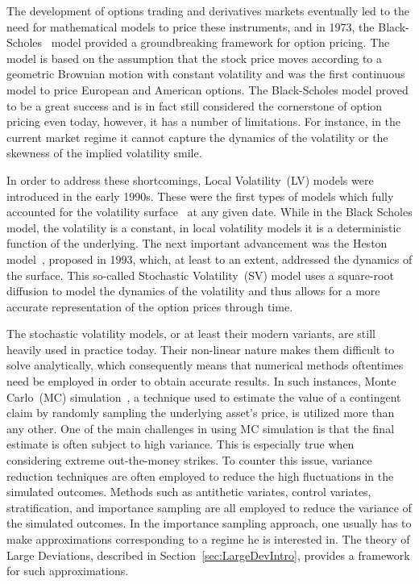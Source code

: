 The development of options trading and derivatives markets eventually led to the need for mathematical models to price these instruments, and in 1973, the Black-Scholes~\cite{Black1973TheLiabilities} model provided a groundbreaking framework for option pricing.
The model is based on the assumption that the stock price moves according to a geometric Brownian motion with constant volatility and was the first continuous model to price European and American options. The Black-Scholes model proved to be a great success and is in fact still considered the cornerstone of option pricing even today, however, it has a number of limitations. For instance, in the current market regime it cannot capture the dynamics of the volatility or the skewness of the implied volatility smile.

In order to address these shortcomings, Local Volatility~(LV) models were introduced in the early 1990s. These were the first types of models which fully accounted for the volatility surface~\cite{Dupire1994PricingSmile, Derman1994RidingSmile} at any given date. While in the Black Scholes model, the volatility is a constant, in local volatility models it is a deterministic function of the underlying. The next important advancement was the Heston model~\cite{Heston1993AOptions}, proposed in 1993, which, at least to an extent, addressed the dynamics of the surface. This so-called Stochastic Volatility~(SV) model uses a square-root diffusion to model the dynamics of the volatility and thus allows for a more accurate representation of the option prices through time.

The stochastic volatility models, or at least their modern variants, are still heavily used in practice today. Their non-linear nature makes them difficult to solve analytically, which consequently means that numerical methods oftentimes need be employed in order to obtain accurate results. In such instances, Monte Carlo~(MC) simulation~\cite{Glasserman2013MonteEngineering}, a technique used to estimate the value of a contingent claim by randomly sampling the underlying asset's price, is utilized more than any other. One of the main challenges in using MC simulation is that the final estimate is often subject to high variance. This is especially true when considering extreme out-the-money strikes. To counter this issue, variance reduction techniques are often employed to reduce the high fluctuations in the simulated outcomes. Methods such as antithetic variates, control variates, stratification, and importance sampling are all employed to reduce the variance of the simulated outcomes. In the importance sampling approach, one usually has to make approximations corresponding to a regime he is interested in. The theory of Large Deviations, described in Section~\ref{sec:LargeDevIntro}, provides a framework for such approximations.

